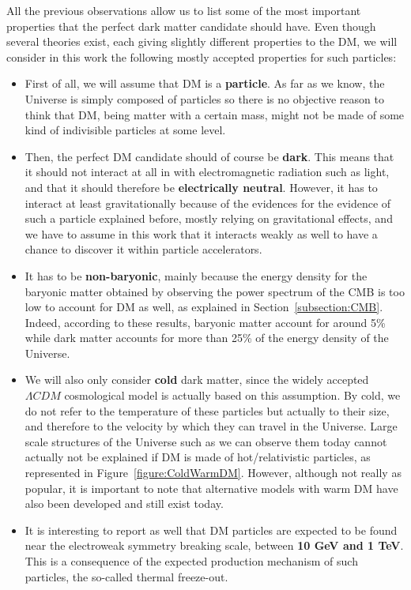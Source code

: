 \documentclass[a4paper, 10pt, openright]{report}
\begin{document}
All the previous observations allow us to list some of the most important properties that the perfect dark matter candidate should have. Even though several theories exist, each giving slightly different properties to the \ac{DM}, we will consider in this work the following mostly accepted properties for such particles:
\begin{itemize}
\item First of all, we will assume that \ac{DM} is a \textbf{particle}. As far as we know, the Universe is simply composed of particles so there is no objective reason to think that \ac{DM}, being matter with a certain mass, might not be made of some kind of indivisible particles at some level.
\item Then, the perfect \ac{DM} candidate should of course be \textbf{dark}. This means that it should not interact at all in with electromagnetic radiation such as light, and that it should therefore be \textbf{electrically neutral}. However, it has to interact at least gravitationally because of the evidences for the evidence of such a particle explained before, mostly relying on gravitational effects, and we have to assume in this work that it interacts weakly as well to have a chance to discover it within particle accelerators.
\item It has to be \textbf{non-baryonic}, mainly because the energy density for the baryonic matter obtained by observing the power spectrum of the \ac{CMB} is too low to account for \ac{DM} as well, as explained in Section~\ref{subsection:CMB}. Indeed, according to these results, baryonic matter account for around 5\% while dark matter accounts for more than 25\% of the energy density of the Universe. 
\item We will also only consider \textbf{cold} dark matter, since the widely accepted $\Lambda CDM$ cosmological model is actually based on this assumption. By cold, we do not refer to the temperature of these particles but actually to their size, and therefore to the velocity by which they can travel in the Universe. Large scale structures of the Universe such as we can observe them today cannot actually not be explained if \ac{DM} is made of hot/relativistic particles, as represented in Figure~\ref{figure:ColdWarmDM}. However, although not really as popular, it is important to note that alternative models with warm \ac{DM} have also been developed and still exist today.
\item It is interesting to report as well that \ac{DM} particles are expected to be found near the electroweak symmetry breaking scale, between \textbf{10 GeV and 1 TeV}. This is a consequence of the expected production mechanism of such particles, the so-called thermal freeze-out. 


\end{itemize}
\end{document}
